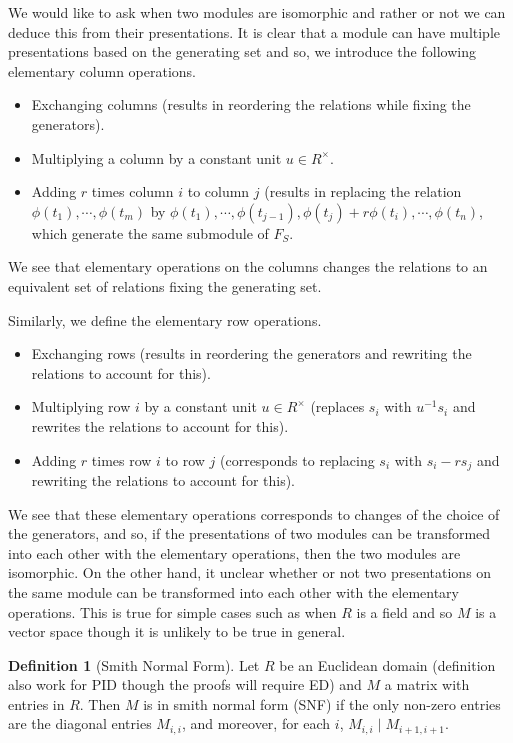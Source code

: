 \documentclass[]{article}
\theoremstyle{definition}
\theoremstyle{definition}
\newtheorem{definition}{Definition}[section]
\begin{document}
We would like to ask when two modules are isomorphic and rather or not we 
can deduce this from their presentations. It is clear that a module can have 
multiple presentations based on the generating set and so, we introduce the 
following elementary column operations.
\begin{itemize}
  \item Exchanging columns (results in reordering the relations while fixing the 
    generators).
  \item Multiplying a column by a constant unit \(u \in R^\times\).
  \item Adding \(r\) times column \(i\) to column \(j\) (results in replacing the 
    relation \(\phi(t_1), \cdots, \phi(t_m)\) by 
    \(\phi(t_1), \cdots, \phi(t_{j - 1}), \phi(t_j) + r\phi(t_i), \cdots, \phi(t_n)\),
  which generate the same submodule of \(F_S\).
\end{itemize}
We see that elementary operations on the columns changes the relations to an 
equivalent set of relations fixing the generating set.

Similarly, we define the elementary row operations.
\begin{itemize}
  \item Exchanging rows (results in reordering the generators and rewriting the 
    relations to account for this).
  \item Multiplying row \(i\) by a constant unit \(u \in R^\times\) (replaces 
  \(s_i\) with \(u^{-1}s_i\) and rewrites the relations to account for this).
  \item Adding \(r\) times row \(i\) to row \(j\) (corresponds to replacing 
  \(s_i\) with \(s_i - rs_j\) and rewriting the relations to account for this).
\end{itemize}
We see that these elementary operations corresponds to changes of the choice 
of the generators, and so, if the presentations of two modules can be 
transformed into each other with the elementary operations, then the two modules 
are isomorphic. On the other hand, it unclear whether or not two presentations 
on the same module can be transformed into each other with the elementary operations. 
This is true for simple cases such as when \(R\) is a field and so \(M\) 
is a vector space though it is unlikely to be true in general.

\begin{definition}[Smith Normal Form]
  Let \(R\) be an Euclidean domain (definition also work for PID though the 
  proofs will require ED) and \(M\) a matrix with entries in \(R\). Then 
  \(M\) is in smith normal form (SNF) if the only non-zero entries are the 
  diagonal entries \(M_{i,i}\), and moreover, for each \(i\), 
  \(M_{i,i} \mid M_{i+1, i+1}\).
\end{definition}
\end{document}
